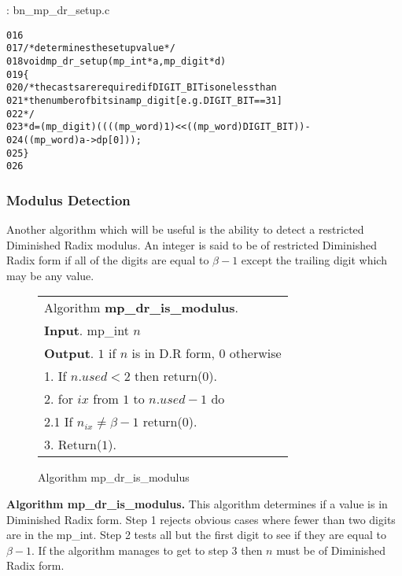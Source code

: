 \documentclass[b5paper]{book}
\begin{document}
\vspace{+3mm}\begin{small}
\hspace{-5.1mm}{\bf File}: bn\_mp\_dr\_setup.c
\vspace{-3mm}
\begin{alltt}
016   
017   /* determines the setup value */
018   void mp_dr_setup(mp_int *a, mp_digit *d)
019   \{
020      /* the casts are required if DIGIT_BIT is one less than
021       * the number of bits in a mp_digit [e.g. DIGIT_BIT==31]
022       */
023      *d = (mp_digit)((((mp_word)1) << ((mp_word)DIGIT_BIT)) - 
024           ((mp_word)a->dp[0]));
025   \}
026   
\end{alltt}
\end{small}

\subsubsection{Modulus Detection}
Another algorithm which will be useful is the ability to detect a restricted Diminished Radix modulus.  An integer is said to be
of restricted Diminished Radix form if all of the digits are equal to $\beta - 1$ except the trailing digit which may be any value.

\begin{figure}[!here]
\begin{small}
\begin{center}
\begin{tabular}{l}
\hline Algorithm \textbf{mp\_dr\_is\_modulus}. \\
\textbf{Input}.   mp\_int $n$ \\
\textbf{Output}.  $1$ if $n$ is in D.R form, $0$ otherwise \\
\hline
1.  If $n.used < 2$ then return($0$). \\
2.  for $ix$ from $1$ to $n.used - 1$ do \\
\hspace{3mm}2.1  If $n_{ix} \ne \beta - 1$ return($0$). \\
3.  Return($1$). \\
\hline
\end{tabular}
\end{center}
\end{small}
\caption{Algorithm mp\_dr\_is\_modulus}
\end{figure}

\textbf{Algorithm mp\_dr\_is\_modulus.}
This algorithm determines if a value is in Diminished Radix form.  Step 1 rejects obvious cases where fewer than two digits are
in the mp\_int.  Step 2 tests all but the first digit to see if they are equal to $\beta - 1$.  If the algorithm manages to get to
step 3 then $n$ must be of Diminished Radix form.
\end{document}
